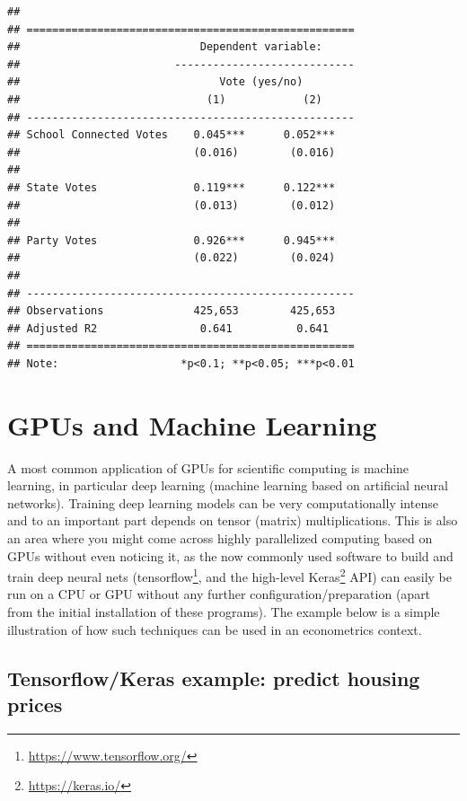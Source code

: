 \documentclass[
  12pt,
]{style/krantz}
\renewcommand{\href}[2]{#2\footnote{\url{#1}}}
\begin{document}
\begin{verbatim}
## 
## ===================================================
##                            Dependent variable:     
##                        ----------------------------
##                               Vote (yes/no)        
##                             (1)            (2)     
## ---------------------------------------------------
## School Connected Votes    0.045***      0.052***   
##                           (0.016)        (0.016)   
##                                                    
## State Votes               0.119***      0.122***   
##                           (0.013)        (0.012)   
##                                                    
## Party Votes               0.926***      0.945***   
##                           (0.022)        (0.024)   
##                                                    
## ---------------------------------------------------
## Observations              425,653        425,653   
## Adjusted R2                0.641          0.641    
## ===================================================
## Note:                   *p<0.1; **p<0.05; ***p<0.01
\end{verbatim}

\hypertarget{gpus-and-machine-learning}{%
\chapter{GPUs and Machine Learning}\label{gpus-and-machine-learning}}

A most common application of GPUs for scientific computing is machine learning, in particular deep learning (machine learning based on artificial neural networks). Training deep learning models can be very computationally intense and to an important part depends on tensor (matrix) multiplications. This is also an area where you might come across highly parallelized computing based on GPUs without even noticing it, as the now commonly used software to build and train deep neural nets (\href{https://www.tensorflow.org/}{tensorflow}, and the high-level \href{https://keras.io/}{Keras} API) can easily be run on a CPU or GPU without any further configuration/preparation (apart from the initial installation of these programs). The example below is a simple illustration of how such techniques can be used in an econometrics context.

\hypertarget{tensorflowkeras-example-predict-housing-prices}{%
\section{Tensorflow/Keras example: predict housing prices}\label{tensorflowkeras-example-predict-housing-prices}}
\end{document}
